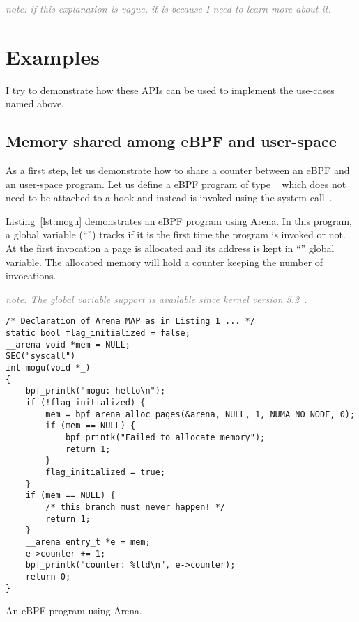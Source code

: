 \documentclass{article}
\begin{document}
\textcolor{gray}{\emph{note: if this explanation is vague, it is because I need
to learn more about it.}}


\section{Examples}

I try to demonstrate how these APIs can be used to implement the use-cases
named above.

\subsection{Memory shared among eBPF and user-space}

As a first step, let us demonstrate how to share a counter between an eBPF
and an user-space program. Let us define a eBPF program of type
~\cite{ebpf_docs_prog_syscall} which does not need to
be attached to a hook and instead is invoked using the 
system call~\cite{ebpf_docs_bpf_prog_run}.

Listing~\ref{lst:mogu} demonstrates an eBPF program using Arena. In this
program, a global variable (``'') tracks if it is the first
time the program is invoked or not. At the first invocation a page is allocated
and its address is kept in ``'' global variable. The allocated memory
will hold a counter keeping the number of invocations.

\textcolor{gray}{\textit{note: The global variable support is available since
kernel version 5.2~\cite{glb_var_post}.}}

\begin{listing}
\begin{verbatim}
/* Declaration of Arena MAP as in Listing 1 ... */
static bool flag_initialized = false;
__arena void *mem = NULL;
SEC("syscall")
int mogu(void *_)
{
    bpf_printk("mogu: hello\n");
    if (!flag_initialized) {
        mem = bpf_arena_alloc_pages(&arena, NULL, 1, NUMA_NO_NODE, 0);
        if (mem == NULL) {
            bpf_printk("Failed to allocate memory");
            return 1;
        }
        flag_initialized = true;
    }
    if (mem == NULL) {
        /* this branch must never happen! */
        return 1;
    }
    __arena entry_t *e = mem;
    e->counter += 1;
    bpf_printk("counter: %lld\n", e->counter);
    return 0;
}
\end{verbatim}
\caption{An eBPF program using Arena.}
\label{lst:mogu}
\end{listing}
\end{document}
